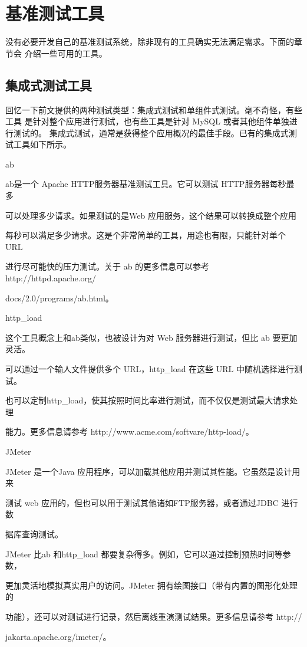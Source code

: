 \section{基准测试工具}
没有必要开发自己的基准测试系统，除非现有的工具确实无法满足需求。下面的章节会
介绍一些可用的工具。

\subsection{集成式测试工具}
回忆一下前文提供的两种测试类型：集成式测试和单组件式测试。毫不奇怪，有些工具
是针对整个应用进行测试，也有些工具是针对 MySQL 或者其他组件单独进行测试的。
集成式测试，通常是获得整个应用概况的最佳手段。已有的集成式测试工具如下所示。

ab

ab是一个 Apache HTTP服务器基准测试工具。它可以测试 HTTP服务器每秒最多

可以处理多少请求。如果测试的是Web 应用服务，这个结果可以转换成整个应用

每秒可以满足多少请求。这是个非常简单的工具，用途也有限，只能针对单个 URL

进行尽可能快的压力测试。关于 ab 的更多信息可以参考 http://httpd.apache.org/

docs/2.0/programs/ab.html。

http\_load

这个工具概念上和ab类似，也被设计为对 Web 服务器进行测试，但比 ab 要更加灵活。

可以通过一个输人文件提供多个 URL，http\_load 在这些 URL 中随机选择进行测试。

也可以定制http\_load，使其按照时间比率进行测试，而不仅仅是测试最大请求处理

能力。更多信息请参考 http://www.acme.com/softvare/http-load/。

JMeter

JMeter 是一个Java 应用程序，可以加载其他应用并测试其性能。它虽然是设计用来

测试 web 应用的，但也可以用于测试其他诸如FTP服务器，或者通过JDBC 进行数

据库查询测试。

JMeter 比ab 和http\_load 都要复杂得多。例如，它可以通过控制预热时间等参数，

更加灵活地模拟真实用户的访问。JMeter 拥有绘图接口（带有内置的图形化处理的

功能），还可以对测试进行记录，然后离线重演测试结果。更多信息请参考 http://

jakarta.apache.org/imeter/。

